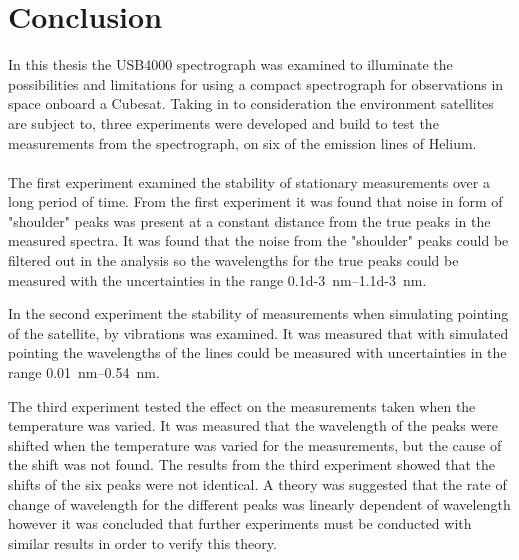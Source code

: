 \chapter{Conclusion}
In this thesis the USB4000 spectrograph was examined to illuminate the possibilities and limitations for using a compact spectrograph for observations in space onboard a Cubesat. Taking in to consideration the environment satellites are subject to, three experiments were developed and build to test the measurements from the spectrograph, on six of the emission lines of Helium. 
\\
\\
The first experiment examined the stability of stationary measurements over a long period of time. From the first experiment it was found that noise in form of "shoulder" peaks was present at a constant distance from the true peaks in the measured spectra. It was found that the noise from the "shoulder" peaks could be filtered out in the analysis so the wavelengths for the true peaks could be measured with the uncertainties in the range \SIrange{0.1d-3}{1.1d-3}{\nano\meter}.

In the second experiment the stability of measurements when simulating pointing of the satellite, by vibrations was examined. It was measured that with simulated pointing the wavelengths of the lines could be measured with uncertainties in the range \SIrange{0,01}{0,54}{\nano\meter}.

The third experiment tested the effect on the measurements taken when the temperature was varied. It was measured that the wavelength of the peaks were shifted when the temperature was varied for the measurements, but the cause of the shift was not found. The results from the third experiment showed that the shifts of the six peaks were not identical. A theory was suggested that the rate of change of wavelength for the different peaks was linearly dependent of wavelength however it was concluded that further experiments must be conducted with similar results in order to verify this theory.
